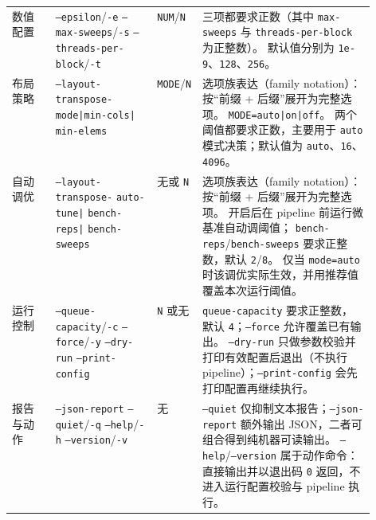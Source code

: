 \begin{xltabular}{\linewidth}{@{}>{\raggedright\arraybackslash}p{0.12\linewidth}>{\raggedright\arraybackslash}p{0.29\linewidth}>{\raggedright\arraybackslash}p{0.12\linewidth}>{\raggedright\arraybackslash}X@{}}
        数值配置
        & \texttt{--epsilon}/\texttt{-e}\newline
          \texttt{--max-sweeps}/\texttt{-s}\newline
          \texttt{--threads-per-block}/\texttt{-t}
        & \texttt{NUM}/\texttt{N}
        & 三项都要求正数（其中 \texttt{max-sweeps} 与 \texttt{threads-per-block} 为正整数）。
          默认值分别为 \texttt{1e-9}、\texttt{128}、\texttt{256}。 \\

        布局策略
        & \texttt{--layout-transpose-}\newline
          \texttt{mode|min-cols|}\newline
          \texttt{min-elems}
        & \texttt{MODE}/\texttt{N}
        & 选项族表达（family notation）：按“前缀 + 后缀”展开为完整选项。
          \texttt{MODE=auto|on|off}。
          两个阈值都要求正数，主要用于 \texttt{auto} 模式决策；默认值为 \texttt{auto}、\texttt{16}、\texttt{4096}。 \\

        自动调优
        & \texttt{--layout-transpose-}\newline
          \texttt{auto-tune|}\newline
          \texttt{bench-reps|}\newline
          \texttt{bench-sweeps}
        & 无或 \texttt{N}
        & 选项族表达（family notation）：按“前缀 + 后缀”展开为完整选项。
          开启后在 pipeline 前运行微基准自动调阈值；
          \texttt{bench-reps}/\texttt{bench-sweeps} 要求正整数，默认 \texttt{2}/\texttt{8}。
          仅当 \texttt{mode=auto} 时该调优实际生效，并用推荐值覆盖本次运行阈值。 \\

        运行控制
        & \texttt{--queue-capacity}/\texttt{-c}\newline
          \texttt{--force}/\texttt{-y}\newline
          \texttt{--dry-run}\newline
          \texttt{--print-config}
        & \texttt{N} 或无
        & \texttt{queue-capacity} 要求正整数，默认 \texttt{4}；\texttt{--force} 允许覆盖已有输出。
          \texttt{--dry-run} 只做参数校验并打印有效配置后退出（不执行 pipeline）；\texttt{--print-config} 会先打印配置再继续执行。 \\

        报告与动作
        & \texttt{--json-report}\newline
          \texttt{--quiet}/\texttt{-q}\newline
          \texttt{--help}/\texttt{-h}\newline
          \texttt{--version}/\texttt{-v}
        & 无
        & \texttt{--quiet} 仅抑制文本报告；\texttt{--json-report} 额外输出 JSON，二者可组合得到纯机器可读输出。
          \texttt{--help}/\texttt{--version} 属于动作命令：直接输出并以退出码 \texttt{0} 返回，不进入运行配置校验与 pipeline 执行。 \\
    \end{xltabular}
\endgroup

